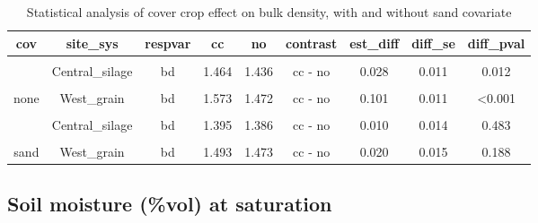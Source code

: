 \documentclass[
]{article}
\begin{document}
\begin{table}[H]

\caption{\label{tab:bulkden}Statistical analysis of cover crop effect on bulk density, with and without sand covariate}
\centering
\begin{tabular}[t]{ccccccccc}
\toprule
cov & site\_sys & respvar & cc & no & contrast & est\_diff & diff\_se & diff\_pval\\
\midrule
\cellcolor{gray!6}{none} & \cellcolor{gray!6}{Central\_grain} & \cellcolor{gray!6}{bd} & \cellcolor{gray!6}{1.422} & \cellcolor{gray!6}{1.374} & \cellcolor{gray!6}{cc - no} & \cellcolor{gray!6}{0.048} & \cellcolor{gray!6}{0.010} & \cellcolor{gray!6}{<0.001}\\
 & Central\_silage & bd & 1.464 & 1.436 & cc - no & 0.028 & 0.011 & 0.012\\

\cellcolor{gray!6}{none} & \cellcolor{gray!6}{East\_grain} & \cellcolor{gray!6}{bd} & \cellcolor{gray!6}{1.437} & \cellcolor{gray!6}{1.488} & \cellcolor{gray!6}{cc - no} & \cellcolor{gray!6}{-0.050} & \cellcolor{gray!6}{0.011} & \cellcolor{gray!6}{<0.001}\\
\multirow{-4}{*}{\centering\arraybackslash none} & West\_grain & bd & 1.573 & 1.472 & cc - no & 0.101 & 0.011 & <0.001\\
\cmidrule{1-9}
\cellcolor{gray!6}{sand} & \cellcolor{gray!6}{Central\_grain} & \cellcolor{gray!6}{bd} & \cellcolor{gray!6}{1.309} & \cellcolor{gray!6}{1.275} & \cellcolor{gray!6}{cc - no} & \cellcolor{gray!6}{0.033} & \cellcolor{gray!6}{0.013} & \cellcolor{gray!6}{0.011}\\
 & Central\_silage & bd & 1.395 & 1.386 & cc - no & 0.010 & 0.014 & 0.483\\

\cellcolor{gray!6}{sand} & \cellcolor{gray!6}{East\_grain} & \cellcolor{gray!6}{bd} & \cellcolor{gray!6}{1.653} & \cellcolor{gray!6}{1.752} & \cellcolor{gray!6}{cc - no} & \cellcolor{gray!6}{-0.098} & \cellcolor{gray!6}{0.015} & \cellcolor{gray!6}{<0.001}\\
\multirow{-4}{*}{\centering\arraybackslash sand} & West\_grain & bd & 1.493 & 1.473 & cc - no & 0.020 & 0.015 & 0.188\\
\bottomrule
\end{tabular}
\end{table}

\hypertarget{soil-moisture-vol-at-saturation}{%
\subsection{Soil moisture (\%vol) at
saturation}\label{soil-moisture-vol-at-saturation}}
\end{document}
